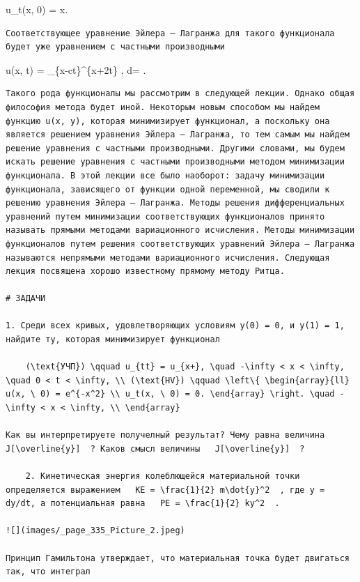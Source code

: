 \documentclass[
  ukrainian,
]{article}
\begin{document}
u\_t(x, 0) = \sin x.

\begin{verbatim}
Соответствующее уравнение Эйлера — Лагранжа для такого функционала будет уже уравнением с частными производными
\end{verbatim}

u(x, t) =  \int\_\{x-ct\}\^{}\{x+2t\} \sin \xi , d\xi =
 .

\begin{verbatim}
Такого рода функционалы мы рассмотрим в следующей лекции. Однако общая философия метода будет иной. Некоторым новым способом мы найдем функцию u(x, y), которая минимизирует функционал, а поскольку она является решением уравнения Эйлера — Лагранжа, то тем самым мы найдем решение уравнения с частными производными. Другими словами, мы будем искать решение уравнения с частными производными методом минимизации функционала. В этой лекции все было наоборот: задачу минимизации функционала, зависящего от функции одной переменной, мы сводили к решению уравнения Эйлера — Лагранжа. Методы решения дифференциальных уравнений путем минимизации соответствующих функционалов принято называть прямыми методами вариационного исчисления. Методы минимизации функционалов путем решения соответствующих уравнений Эйлера — Лагранжа называются непрямыми методами вариационного исчисления. Следующая лекция посвящена хорошо известному прямому методу Ритца.

# ЗАДАЧИ

1. Среди всех кривых, удовлетворяющих условиям y(0) = 0, и y(1) = 1, найдите ту, которая минимизирует функционал

    (\text{УЧП}) \qquad u_{tt} = u_{x+}, \quad -\infty < x < \infty, \quad 0 < t < \infty, \\ (\text{HV}) \qquad \left\{ \begin{array}{ll} u(x, \ 0) = e^{-x^2} \\ u_t(x, \ 0) = 0. \end{array} \right. \quad -\infty < x < \infty, \\ \end{array}

Как вы интерпретируете получелный результат? Чему равна величина   J[\overline{y}]  ? Каков смысл величины   J[\overline{y}]  ?

    2. Кинетическая энергия колеблющейся материальной точки определяется выражением   KE = \frac{1}{2} m\dot{y}^2  , где y = dy/dt, а потенциальная равна   PE = \frac{1}{2} ky^2  .

![](images/_page_335_Picture_2.jpeg)

Принцип Гамильтона утверждает, что материальная точка будет двигаться так, что интеграл
\end{verbatim}
\end{document}

